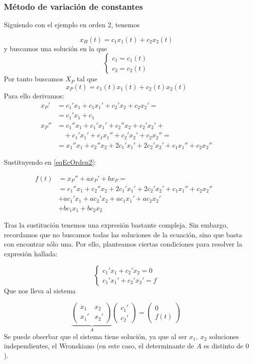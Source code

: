 \subsubsection{Método de variación de constantes}
\label{secMetodoVarConst}

Siguiendo con el ejemplo en orden 2, tenemos 

\[ x_H (t) = c_1x_1(t) + c_2x_2(t) \]
y buscamos una solución en la que
$$
\left\lbrace
\begin{array}{l}
c_1 = c_1(t)\\
c_2 = c_2(t)
\end{array}
\right. 
$$
Por tanto buscamos $X_P$ tal que
\[ x_P(t) = c_1(t)x_1(t) + c_2(t)x_2(t) \] Para ello derivamos:
\begin{align*}
x_P'&= c_1'x_1 + c_1x_1' + c_2'x_2 + c_2x_2' = \\
	&= c_1'x_1 + c_1 \\
x_P'' 	&= c_1''x_1+c_1'x_1' + c_2''x_2+c_2'x_2' + \\ 
		&\quad+ c_1'x_1'+c_1x_1'' + c_2'x_2' + c_2x_2'' = \\
		&= x_1''x_1 + c_2''x_2+2c_1'x_1'+2c_2'x_2' + c_1x_1'' +c_2x_2'' 
\end{align*}

Sustituyendo en \eqref{eqEcOrden2}:

\begin{align*}
f(t) &= x_P'' + ax_P' + bx_P = &  \\
	&= c_1''x_1 + c_2''x_2 + 2c_1'x_1' + 2c_2'x_2'  + c_1x_1''  + c_2x_2'' \\
	& + ac_1' x_1 + ac_2'x_2  + ac_1x_1'  + ac_2x_2' \\
	&  + bc_1x_1  + bc_2x_2 
\end{align*}

Tras la sustitución tenemos una expresión bastante compleja. Sin embargo, recordamos que no buscamos todas las soluciones de la ecuación, sino que basta con encontrar sólo una. Por ello, planteamos ciertas condiciones para resolver la expresión hallada:

$$ \left\lbrace \begin{array}{l}
c_1'x_1 + c_2'x_2 = 0 \\  
c_1'x_1' + c_2'x_2' = f
\end{array} \right. $$
Que nos lleva al sistema

\[ \underbrace{\begin{pmatrix}
x_1 & x_2 \\
x_1' & x_2' 
\end{pmatrix}}_A\begin{pmatrix}
c_1' \\ c_2'
\end{pmatrix} = \begin{pmatrix}
0 \\ f(t)
\end{pmatrix} \] 
Se puede obserbar que el sistema tiene solución, ya que al ser $x_1,\ x_2$ soluciones independientes, el Wronskiano (en este caso, el determinante de $A$ es distinto de $0$).

